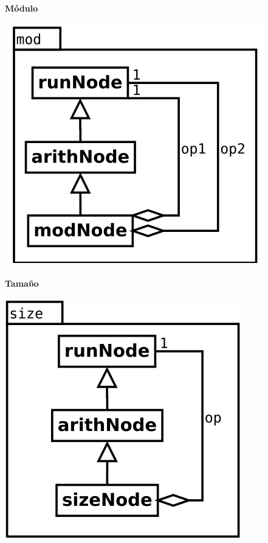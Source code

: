 \paragraph {Módulo}
\begin{center}
\includegraphics[scale=0.4]{mod.png} \\
\end{center}

\paragraph {Tamaño}
\begin{center}
\includegraphics[scale=0.4]{size.png} \\
\end{center}

